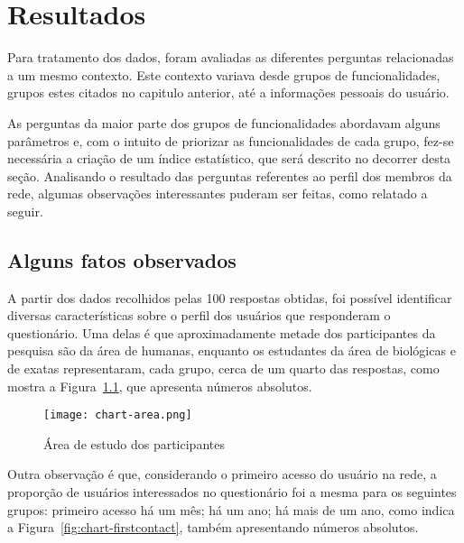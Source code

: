 \chapter{Resultados}
\label{cap:resultados}
    
    Para tratamento dos dados, foram avaliadas as diferentes perguntas relacionadas a um mesmo contexto. Este contexto variava desde grupos de funcionalidades, grupos estes citados no capitulo anterior, até a informações pessoais do usuário. 
    
    As perguntas da maior parte dos grupos de funcionalidades abordavam alguns parâmetros e, com o intuito de priorizar as funcionalidades de cada grupo, fez-se necessária a criação de um índice estatístico, que será descrito no decorrer desta seção.  Analisando o resultado das perguntas referentes ao perfil dos membros da rede, algumas observações interessantes puderam ser feitas, como relatado a seguir.

\section{Alguns fatos observados}
\label{sec:observacoes}

    A partir dos dados recolhidos pelas 100 respostas obtidas, foi possível identificar diversas características sobre o perfil dos usuários que responderam o questionário. Uma delas é que aproximadamente metade dos participantes da pesquisa são da área de humanas, enquanto os estudantes da área de biológicas e de exatas representaram, cada grupo, cerca de um quarto das respostas, como mostra a Figura~\ref{fig:chart-area}, que apresenta números absolutos.
    
\begin{figure}[!h]
  \centering
  \texttt{[image: chart-area.png]} 
  \caption{Área de estudo dos participantes}
  \label{fig:chart-area} 
\end{figure}
Outra observação é que, considerando o primeiro acesso do usuário na rede, a proporção de usuários interessados no questionário foi a mesma para os seguintes grupos: primeiro acesso há um mês; há um ano; há mais de um ano, como indica a Figura~\ref{fig:chart-firstcontact}, também apresentando números absolutos.
    
